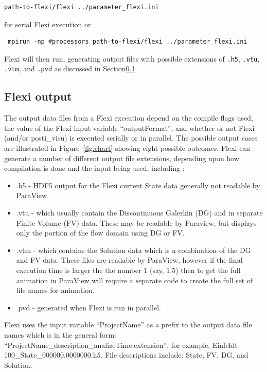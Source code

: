 \begin{appendices}
\begin{verbatim}
path-to-flexi/flexi ../parameter_flexi.ini
\end{verbatim}
\noindent for serial Flexi execution or

\begin{verbatim}
 mpirun -np #processors path-to-flexi/flexi ../parameter_flexi.ini
\end{verbatim}
\noindent Flexi will then run, generating output files with possible extensions of \verb|.h5|, \verb|.vtu|, \verb|.vtm|, and \verb|.pvd| as discussed in Section\ref{sec:files}.

\subsection{Flexi output}\label{sec:files}
The output data files from a Flexi execution depend on the compile flags used, the value of the Flexi input variable ``outputFormat'', and whether or not Flexi (and/or posti\_visu)  is executed serially or in parallel.  The possible output cases are illustrated in Figure~\ref{fig:chart} showing eight possible outcomes. Flexi can generate a number of different output file extensions, depending upon how compilation is done and the input being used, including :

\begin{itemize}
 \item .h5 - HDF5 output for the Flexi current State data generally not readable by ParaView.
 \item .vtu - which usually contain the Discontinuous Galerkin (DG) and in separate Finite Volume (FV) data. These may be readable by Paraview, but displays only the portion of the flow domain using DG or FV.
 \item .vtm - which contains the Solution data which is a combination of the DG and FV data.  These files are readable by ParaView, however if the final execution time is larger the the number $1$ (say, $1.5$) then to get the full animation in ParaView will require a separate code to create the full set of file names for animation.
 \item .pvd - generated when Flexi is run in parallel.
\end{itemize}

\noindent Flexi uses the input variable ``ProjectName'' as a prefix to the output data file names which is in the general form: ``ProjectName\_description\_analizeTime.extension'', for example, Einfeldt-100\_State\_000000.0000000.h5.  File descriptions include: State, FV, DG, and Solution.


\end{appendices}
